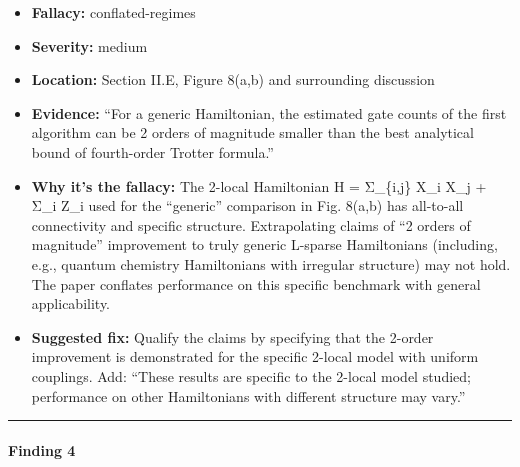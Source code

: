 \documentclass[10pt,letterpaper]{article}
\providecommand{\tightlist}{\setlength{\itemsep}{0pt}\setlength{\parskip}{0pt}}
\begin{document}
\begin{itemize}
\tightlist
\item
  \textbf{Fallacy:} conflated-regimes
\item
  \textbf{Severity:} medium
\item
  \textbf{Location:} Section II.E, Figure 8(a,b) and surrounding discussion
\item
  \textbf{Evidence:} ``For a generic Hamiltonian, the estimated gate counts of the first algorithm can be 2 orders of magnitude smaller than the best analytical bound of fourth-order Trotter formula.''
\item
  \textbf{Why it's the fallacy:} The 2-local Hamiltonian H = Σ\_\{i,j\} X\_i X\_j + Σ\_i Z\_i used for the ``generic'' comparison in Fig. 8(a,b) has all-to-all connectivity and specific structure. Extrapolating claims of ``2 orders of magnitude'' improvement to truly generic L-sparse Hamiltonians (including, e.g., quantum chemistry Hamiltonians with irregular structure) may not hold. The paper conflates performance on this specific benchmark with general applicability.
\item
  \textbf{Suggested fix:} Qualify the claims by specifying that the 2-order improvement is demonstrated for the specific 2-local model with uniform couplings. Add: ``These results are specific to the 2-local model studied; performance on other Hamiltonians with different structure may vary.''
\end{itemize}

\begin{center}\rule{0.5\linewidth}{0.5pt}\end{center}

\hypertarget{finding-4}{%
\paragraph{Finding 4}\label{finding-4}}
\end{document}

